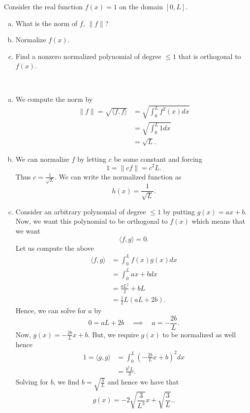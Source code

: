 \documentclass[12pt]{article} %
\newcommand{\innprod}[2]{\langle #1, #2 \rangle}
\begin{document}
\newpage
\begin{problem}
	Consider the real function $f(x)=1$ on the domain $[0,L]$.
	\begin{enumerate}[(a)]
		\item What is the norm of $f$, $\|f\|$?
		\item Normalize $f(x)$.
		\item Find a nonzero normalized polynomial of degree $\leq 1$ that is orthogonal to $f(x)$.
	\end{enumerate}
\end{problem}
\begin{solution}~
	\begin{enumerate}[(a)]
		\item We compute the norm by
		\begin{align*}
			\|f\| = \sqrt{\innprod{f}{f}} &=\sqrt{ \int_0^L f^2(x)dx}\\
			&=\sqrt{ \int_0^L 1 dx}\\
			&= \sqrt{L}.
		\end{align*}
		\item We can normalize $f$ by letting $c$ be some constant and forcing
		\[
		1=\|cf\| = c^2L.
		\]
		Thus $c=\frac{1}{\sqrt{L}}$.  We can write the normalized function as
		\[
		h(x)=\frac{1}{\sqrt{L}}. 
		\]
		\item Consider an arbitrary polynomial of degree $\leq 1$ by putting $g(x)=ax+b$.  Now, we want this polynomial to be orthogonal to $f(x)$ which means that we want
		\[
		\innprod{f}{g}=0.
		\]
		Let us compute the above
		\begin{align*}
			\innprod{f}{g} &= \int_0^L f(x)g(x)dx\\
			&=\int_0^L ax+bdx\\
			&= \frac{aL^2}{2}+bL\\
			&= \frac{1}{2}L\left(aL+2b\right).
		\end{align*}
		Hence, we can solve for $a$ by
		\[
		0=aL+2b \quad \implies \quad a= -\frac{2b}{L}.
		\]
		Now, $g(x)=-\frac{2b}{L}x+b$.  But, we require $g(x)$ to be normalized as well hence
		\begin{align*}
			1=\innprod{g}{g} &= \int_0^L \left(-\frac{2b}{L}x+b\right)^2dx\\
			&= \frac{b^2L}{3}.
		\end{align*}
		Solving for $b$, we find $b=\sqrt{\frac{3}{L}}$ and hence we have that
		\[
		g(x) = -2\sqrt{\frac{3}{L^3}}x+\sqrt{\frac{3}{L}}..
		\]
	\end{enumerate}
\end{solution}
\end{document}
